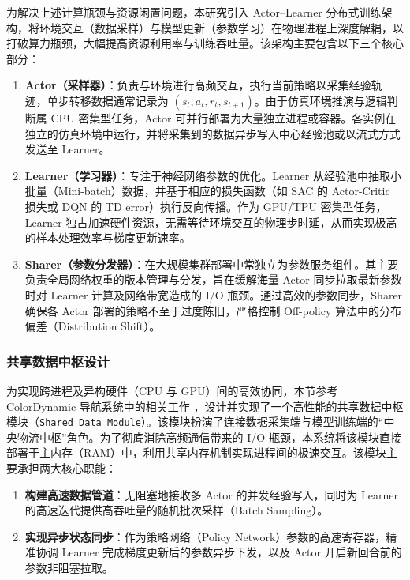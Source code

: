 为解决上述计算瓶颈与资源闲置问题，本研究引入 Actor–Learner 分布式训练架构，将环境交互（数据采样）与模型更新（参数学习）在物理进程上深度解耦，以打破算力瓶颈，大幅提高资源利用率与训练吞吐量。该架构主要包含以下三个核心部分：

\begin{enumerate}
\item \textbf{Actor（采样器）}：负责与环境进行高频交互，执行当前策略以采集经验轨迹，单步转移数据通常记录为 $(s_t, a_t, r_t, s_{t+1})$。由于仿真环境推演与逻辑判断属 CPU 密集型任务，Actor 可并行部署为大量独立进程或容器。各实例在独立的仿真环境中运行，并将采集到的数据异步写入中心经验池或以流式方式发送至 Learner。

\item \textbf{Learner（学习器）}：专注于神经网络参数的优化。Learner 从经验池中抽取小批量（Mini-batch）数据，并基于相应的损失函数（如 SAC 的 Actor-Critic 损失或 DQN 的 TD error）执行反向传播。作为 GPU/TPU 密集型任务，Learner 独占加速硬件资源，无需等待环境交互的物理步时延，从而实现极高的样本处理效率与梯度更新速率。

\item \textbf{Sharer（参数分发器）}：在大规模集群部署中常独立为参数服务组件。其主要负责全局网络权重的版本管理与分发，旨在缓解海量 Actor 同步拉取最新参数时对 Learner 计算及网络带宽造成的 I/O 瓶颈。通过高效的参数同步，Sharer 确保各 Actor 部署的策略不至于过度陈旧，严格控制 Off-policy 算法中的分布偏差（Distribution Shift）。
\end{enumerate}

\subsubsection{共享数据中枢设计}
为实现跨进程及异构硬件（CPU 与 GPU）间的高效协同，本节参考 ColorDynamic 导航系统中的相关工作 \cite{colordynamic}，设计并实现了一个高性能的共享数据中枢模块（\texttt{Shared Data Module}）。该模块扮演了连接数据采集端与模型训练端的“中央物流中枢”角色。为了彻底消除高频通信带来的 I/O 瓶颈，本系统将该模块直接部署于主内存（RAM）中，利用共享内存机制实现进程间的极速交互。该模块主要承担两大核心职能：
\begin{enumerate}
    \item \textbf{构建高速数据管道}：无阻塞地接收多 Actor 的并发经验写入，同时为 Learner 的高速迭代提供高吞吐量的随机批次采样（Batch Sampling）。
    \item \textbf{实现异步状态同步}：作为策略网络（Policy Network）参数的高速寄存器，精准协调 Learner 完成梯度更新后的参数异步下发，以及 Actor 开启新回合前的参数非阻塞拉取。
\end{enumerate}

